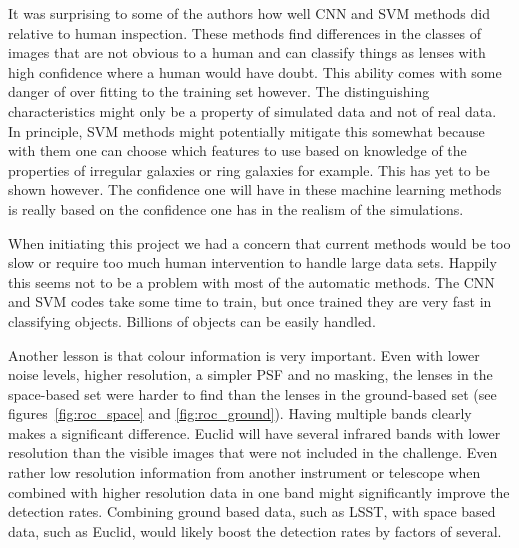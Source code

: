 \documentclass{aa}
\begin{document}
It was surprising to some of the authors how well CNN and SVM methods did relative to human inspection.  These methods find differences in the classes of images that are not obvious to a human and can classify things as lenses with high confidence where a human would have doubt. 
This ability comes with some danger of over fitting to the training set however.  The distinguishing characteristics might only be a property of simulated data and not of real data.  In principle, SVM methods might potentially mitigate this somewhat because with them one can choose which features to use based on knowledge of the properties of irregular galaxies or ring galaxies for example.  This has yet to be shown however.
The confidence one will have in these machine learning methods is really based on the confidence one has in the realism of the simulations.   

When initiating this project we had a concern that current methods would be too slow or require too much human intervention to handle large data sets.  Happily this seems not to be a problem with most of the automatic methods.  The CNN and SVM codes take some time to train, but once trained they are very fast in classifying objects.  Billions of objects can be easily handled.

Another lesson is that colour information is very important.  Even with lower noise levels, higher resolution, a simpler PSF and no masking, the lenses in the space-based set were harder to find than the lenses in the ground-based set (see figures~\ref{fig:roc_space} and \ref{fig:roc_ground}).  Having multiple bands clearly makes a significant difference.  Euclid will have several infrared bands with lower resolution than the visible images that were not included in the challenge.  Even rather low resolution information from another instrument or telescope when combined with higher resolution data in one band might significantly improve the detection rates.  Combining ground based data, such as LSST, with space based data, such as Euclid, would likely boost the detection rates by factors of several.
\end{document}
